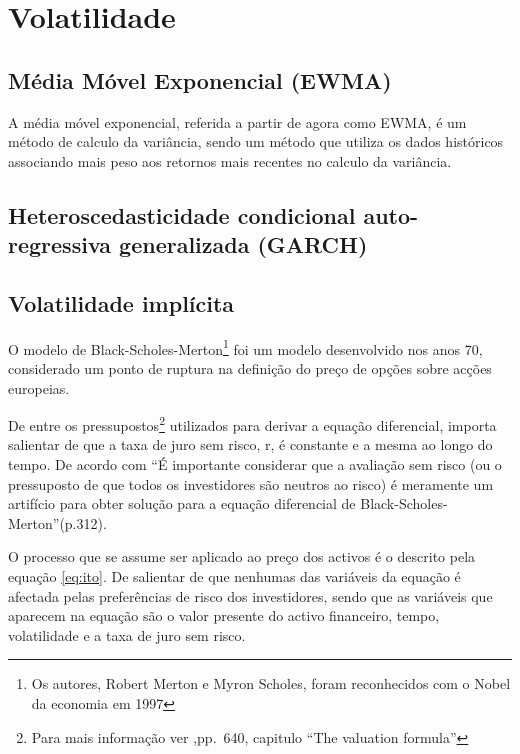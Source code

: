 \documentclass[
  12pt,
  a4paper,
  openany]{book}
\begin{document}
\hypertarget{volatilidade}{%
\section{Volatilidade}\label{volatilidade}}

\hypertarget{muxe9dia-muxf3vel-exponencial-ewma}{%
\subsection{Média Móvel Exponencial (EWMA)}\label{muxe9dia-muxf3vel-exponencial-ewma}}

A média móvel exponencial, referida a partir de agora como EWMA, é um método de calculo da variância, sendo um método que utiliza os dados históricos associando mais peso aos retornos mais recentes no calculo da variância.

\hypertarget{heteroscedasticidade-condicional-auto-regressiva-generalizada-garch}{%
\subsection{Heteroscedasticidade condicional auto-regressiva generalizada (GARCH)}\label{heteroscedasticidade-condicional-auto-regressiva-generalizada-garch}}

\hypertarget{volatilidade-impluxedcita}{%
\subsection{Volatilidade implícita}\label{volatilidade-impluxedcita}}

O modelo de Black-Scholes-Merton\footnote{Os autores, Robert Merton e Myron Scholes, foram reconhecidos com o Nobel da economia em 1997} foi um modelo desenvolvido nos anos 70, considerado um ponto de ruptura na definição do preço de opções sobre acções europeias.

De entre os pressupostos\footnote{Para mais informação ver \citet{BlackScholes},pp.~640, capitulo ``The valuation formula''} utilizados para derivar a equação diferencial, importa salientar de que a taxa de juro sem risco, r, é constante e a mesma ao longo do tempo. De acordo com \citet{Hull2018} ``É importante considerar que a avaliação sem risco (ou o pressuposto de que todos os investidores são neutros ao risco) é meramente um artifício para obter solução para a equação diferencial de Black-Scholes-Merton''(p.312).

O processo que se assume ser aplicado ao preço dos activos é o descrito pela equação \eqref{eq:ito}. De salientar de que nenhumas das variáveis da equação é afectada pelas preferências de risco dos investidores, sendo que as variáveis que aparecem na equação são o valor presente do activo financeiro, tempo, volatilidade e a taxa de juro sem risco.
\end{document}
